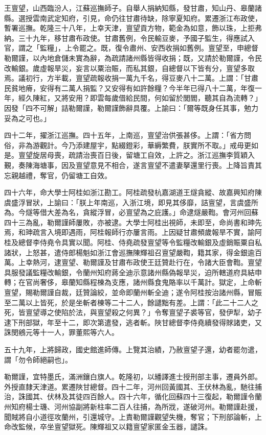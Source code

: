 \begin{pinyinscope}
王亶望，山西臨汾人，江蘇巡撫師子。自舉人捐納知縣，發甘肅，知山丹、皋蘭諸縣。選授雲南武定知府，引見，命仍往甘肅待缺，除寧夏知府。累遷浙江布政使，暫署巡撫。乾隆三十八年，上幸天津，亶望貢方物，範金為如意，飾以珠，上拒弗納。三十九年，移甘肅布政使。甘肅舊例，令民輸豆麥，予國子監生，得應試入官，謂之「監糧」，上令罷之。既，復令肅州、安西收捐如舊例。亶望至，申總督勒爾謹，以內地倉儲未實為辭，為疏請諸州縣皆得收捐；既，又請於勒爾謹，令民改輸銀。歲虛報旱災，妄言以粟治賑，而私其銀，自總督以下皆有分，亶望多取焉。議初行，方半載，亶望疏報收捐一萬九千名，得豆麥八十二萬。上謂：「甘肅民貧地瘠，安得有二萬人捐監？又安得有如許餘糧？今半年已得八十二萬，年復一年，經久陳紅，又將安用？即雲每歲借給民間，何如留於閭閻，聽其自為流轉？」因發「四不可解」詰勒爾謹，勒爾謹飾辭具覆。上諭曰：「爾等既身任其事，勉力妥為之可也。」

四十二年，擢浙江巡撫。四十五年，上南巡，亶望治供張甚侈。上謂：「省方問俗，非為游觀計。今乃添建屋宇，點綴鐙彩，華縟繁費，朕實所不取。」戒毋更如是。亶望旋居母喪，疏請治喪百日後，留塘工自效，上許之。浙江巡撫李質穎入覲，奏陳海塘事，因及亶望意見不相合，遂言亶望不遣妻拏還里行喪。上降旨責其忘親越禮，奪官，仍留塘工自效。

四十六年，命大學士阿桂如浙江勘工。阿桂疏發杭嘉湖道王燧貪縱、故嘉興知府陳虞盛浮冒狀，上諭曰：「朕上年南巡，入浙江境，即見其侈靡，詰亶望，言虞盛所為。今燧等借大差為名，貪縱浮冒，必亶望為之庇護。」命逮燧嚴鞫。會河州回蘇四十三為亂，勒爾謹師屢敗，亦被逮。大學士阿桂出視師，未即至，命尚書和珅先焉，和珅疏言入境即遇雨，阿桂報師行亦屢言雨。上因疑甘肅頻歲報旱不實，諭阿桂及總督李侍堯令具實以聞。阿桂、侍堯疏發亶望等令監糧改輸銀及虛銷賑粟自私諸狀，上怒甚，遣侍郎楊魁如浙江會巡撫陳輝祖召亶望嚴鞫，籍其家，得金銀逾百萬。上幸熱河，逮亶望、勒爾謹及甘肅布政使王廷贊赴行在，令諸大臣會鞫。亶望具服發議監糧改輸銀，令蘭州知府蔣全迪示意諸州縣偽報旱災，迫所轄道府具結申轉；在官尚奢侈，皋蘭知縣程棟為支應，諸州縣食鬼賂率以千萬計。獄定，上命斬亶望，賜勒爾謹自裁，廷贊論絞，並命即蘭州斬全迪；遂令阿桂按治諸州縣，冒賑至二萬以上皆死，於是坐斬者棟等二十二人，餘譴黜有差。上謂：「此二十二人之死，皆亶望導之使陷於法，與亶望殺之何異？」令奪亶望子裘等官，發伊犁，幼子逮下刑部獄，年至十二，即次第遣發，逃者斬。陜甘總督李侍堯續發得賕諸吏，又誅閔鵷元等十一人，罪董熙等六人。

五十九年，上將歸政，國史館進師傳。上覽其治績，乃赦亶望子還，幼者罷勿遣，謂「勿令師絕嗣也」。

勒爾謹，宜特墨氏，滿洲鑲白旗人。乾隆初，以繙譯進士授刑部主事，遷員外郎。外授直隸天津道。累遷陜甘總督。四十二年，河州回黃國其、王伏林為亂，馳往捕治，誅國其、伏林及其徒四百餘人。四十六年，循化回蘇四十三復起，勒爾謹令蘭州知府楊士璣、河州協副將新柱率二百人往捕，為所戕，遂破河州。勒爾謹赴援，聞賊將自小道徑攻蘭州，引還城守。上責勒爾謹觀望失機，奪官；下刑部論斬，上命改監候，卒坐亶望獄死。陳輝祖又以籍亶望家匿金玉器，譴誅。


\end{pinyinscope}
